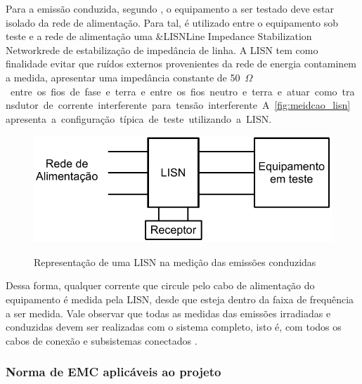             Para a emissão conduzida, segundo , o equipamento a ser testado deve estar isolado da rede de alimentação. Para tal, é utilizado entre o equipamento sob teste e a rede de alimentação uma \abreviatura&{LISN}{Line Impedance Stabilization Network}{rede de estabilização de impedância de linha}. A LISN tem como finalidade evitar que ruídos externos provenientes da rede de energia contaminem a medida, apresentar uma impedância constante de \SI{50}{$\Omega$} entre os fios de fase e terra e entre os fios neutro e terra e atuar como transdutor de corrente interferente para tensão interferente. A \autoref{fig:meidcao_lisn} apresenta a configuração típica de teste utilizando a LISN. 
            
            \begin{figure}[H]
            	\centering
            	\caption{Representação de uma LISN na medição das emissões conduzidas}
            	\includegraphics[scale=1]{pdf/outros/lisn_modelo.pdf}
            	\label{fig:meidcao_lisn}
            \end{figure}
            
            Dessa forma, qualquer corrente que circule pelo cabo de alimentação do equipamento é medida pela LISN, desde que esteja dentro da faixa de frequência a ser medida. Vale observar que todas as medidas das emissões irradiadas e conduzidas devem ser realizadas com o sistema completo, isto é, com todos os cabos de conexão e subsistemas conectados \cite{ref:EMC_phd_schlichting}.
            
            
            \subsubsection{Norma de EMC aplicáveis ao projeto} \label{cap:fund_emc_norma_proj}
            
